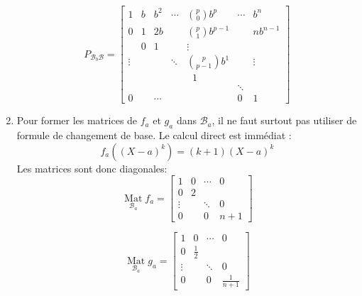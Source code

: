 \begin{enumerate}
\begin{displaymath}
P_{\mathcal{B}_b\mathcal{B}}=
\left[ 
\begin{array}{ccccccc}
1      & b  & b^2    & \cdots & \binom{p}{0}b^p     & \cdots & b^n \\ 
0      & 1  & 2b     &        & \binom{p}{1}b^{p-1} &        & nb^{n-1} \\ 
       & 0  & 1      &        & \vdots              &        &  \\ 
\vdots &    &        & \ddots & \binom{p}{p-1}b^1   &        & \vdots \\ 
       &    &        &        & \; \; 1             &        &  \\ 
       &    &        &        &                     & \ddots &  \\ 
0      &    & \cdots &        &                     & 0      & 1
\end{array}
\right] 
\end{displaymath}
\item Pour former les matrices de $f_a$ et $g_a$ dans $\mathcal{B}_a$, il ne faut surtout pas utiliser de formule de changement de base. Le calcul direct est immédiat :
\[f_a((X-a)^k)=(k+1)(X-a)^k\]
Les matrices sont donc diagonales:
\begin{displaymath}
\underset{\mathcal{B}_a}{\mathop{\mathrm{Mat}}}f_a = \left[ 
\begin{array}{cccc}
1 & 0 & \cdots & 0 \\ 
0 & 2 &  &  \\ 
\vdots &  & \ddots & 0 \\ 
0 &  & 0 & n+1
\end{array} \right] 
\end{displaymath}

\begin{displaymath}
\underset{\mathcal{B}_a}{\mathop{\mathrm{Mat}}}g_a = \left[ 
\begin{array}{cccc}
1 & 0 & \cdots & 0 \\ 
0 & \frac{1}{2} &  &  \\ 
\vdots &  & \ddots & 0 \\ 
0 &  & 0 & \frac{1}{n+1}
\end{array} \right] 
\end{displaymath}

\end{enumerate}
